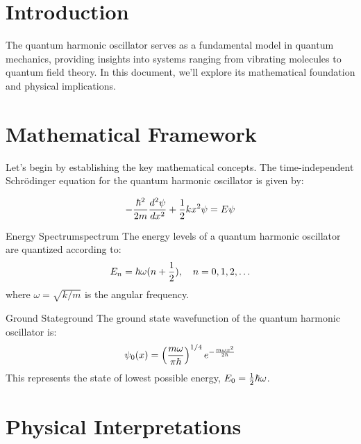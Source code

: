 \documentclass[12pt,a4paper]{article}
\begin{document}

\maketocpage

\newpage

\section{Introduction}

The quantum harmonic oscillator serves as a fundamental model in quantum mechanics, providing insights into systems ranging from vibrating molecules to quantum field theory. In this document, we'll explore its mathematical foundation and physical implications.

\section{Mathematical Framework}

Let's begin by establishing the key mathematical concepts. The time-independent Schrödinger equation for the quantum harmonic oscillator is given by:

\begin{equation}
    -\frac{\hbar^2}{2m}\frac{d^2\psi}{dx^2} + \frac{1}{2}kx^2\psi = E\psi
\end{equation}

\begin{theorem}{Energy Spectrum}{spectrum}
The energy levels of a quantum harmonic oscillator are quantized according to:
\[ E_n = \hbar\omega(n + \frac{1}{2}), \quad n = 0,1,2,\ldots \]
where $\omega = \sqrt{k/m}$ is the angular frequency.
\end{theorem}

\begin{definition}{Ground State}{ground}
The ground state wavefunction of the quantum harmonic oscillator is:
\[ \psi_0(x) = \left(\frac{m\omega}{\pi\hbar}\right)^{1/4} 
    e^{-\frac{m\omega x^2}{2\hbar}} \]
This represents the state of lowest possible energy, $E_0 = \frac{1}{2}\hbar\omega$.
\end{definition}

\section{Physical Interpretations}
\end{document}
